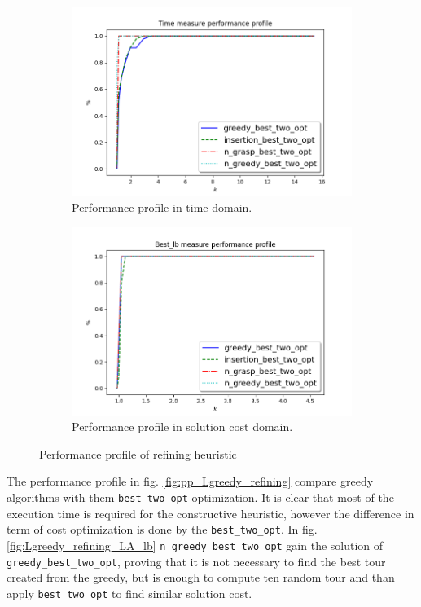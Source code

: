 \begin{figure}[!h]
	\centering
	\begin{subfigure}{.7\textwidth}
		\centering
		\includegraphics[width=\columnwidth]{../res/Lconstructives_refining_LA_time.png}
		\caption{Performance profile in time domain.}
		\label{fig:Lconstructives_refining_time}
	\end{subfigure}
	\begin{subfigure}{.7\textwidth}
		\centering
		\includegraphics[width=\columnwidth]{../res/Lconstructives_refining_LA_lb.png}
		\caption{Performance profile in solution cost domain.}
		\label{fig:Lconstructives_refining_lb}
	\end{subfigure}
\caption{Performance profile of refining heuristic}
\label{fig:pp_Lconstructives_refining}
\end{figure}

The performance profile in fig. \ref{fig:pp_Lgreedy_refining} compare greedy algorithms with them \texttt{best\_two\_opt} optimization. It is clear that most of the execution time is required for the constructive heuristic, however the difference in term of cost optimization is done by the \texttt{best\_two\_opt}. In fig. \ref{fig:Lgreedy_refining_LA_lb} \texttt{n\_greedy\_best\_two\_opt} gain the solution of \texttt{greedy\_best\_two\_opt}, proving that it is not necessary to find the best tour created from the greedy, but is enough to compute ten random tour and than apply \texttt{best\_two\_opt} to find similar solution cost.

